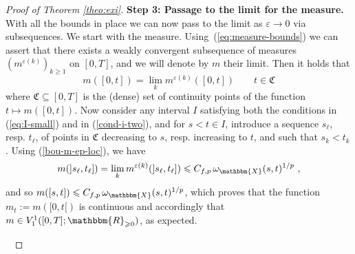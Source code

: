 \documentclass[11pt,reqno,oneside]{amsart}
\numberwithin{equation}{section}
\newcommand{\tmtextbf}[1]{{\bfseries{#1}}}
\newcommand{\ep}{\varepsilon}
\begin{document}
\begin{proof}[Proof of Theorem \ref{theo:exi}]
  
  {\noindent}\tmtextbf{Step 3: Passage to the limit for the measure.} With
  all the bounds in place we can now pass to the limit as $\varepsilon
  \rightarrow 0$ via subsequences. We start with the measure.
  Using~(\ref{eq:measure-bounds}) we can assert that there exists a weakly convergent subsequence
  of measures $(m^{\varepsilon (k)})_{k \geqslant 1}$ on $[0,T]$, and we will denote by $m$
  their limit. Then it holds that
  \begin{equation}
    m ([0, t]) = \lim_k m^{\varepsilon (k)} ([0, t]) \qquad t \in
    \mathfrak{C} \label{eq:convergence-mu}
  \end{equation}
  where $\mathfrak{C} \subseteq [0, T]$ is the (dense) set of continuity points of the function $t\mapsto m([0,t])$. Now consider any interval $I$ satisfying both the conditions in (\ref{eq:I-small}) and in (\ref{cond-i-two}), and for $s<t\in I$, introduce a sequence $s_\ell$, resp. $t_\ell$, of points in $\mathfrak{C}$ decreasing to $s$, resp. increasing to $t$, and such that $s_k<t_k$. Using (\ref{bou-m-ep-loc}), we have
	$$m(]s_\ell,t_\ell])=\lim_{k} m^{\ep(k)}(]s_\ell,t_\ell]) \leqslant C_{f,p} \, \omega_{\mathbbm{X}}(s,t)^{1/p} \ ,$$
	and so $m([s,t])\leqslant C_{f,p} \, \omega_{\mathbbm{X}}(s,t)^{1/p} $, which proves that the function $m_t:=m([0,t[)$ is continuous and accordingly that $m\in V^1_1([0,T];\mathbbm{R}_{\geqslant 0})$, as expected.
	
  
  \
  

\end{proof}
\end{document}
